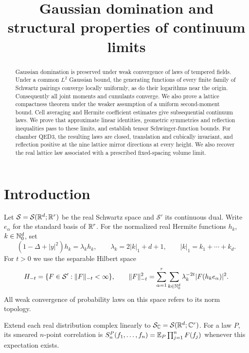 \documentclass[11pt,letterpaper,reqno]{amsart}
\title[Gaussian domination and continuum limits]
 {Gaussian domination and structural properties of continuum limits}
\date{}
\begin{document}
\begin{abstract}
Gaussian domination is preserved under weak convergence of laws of
tempered fields. Under a common $L^2$ Gaussian bound, the generating
functions of every finite family of Schwartz pairings converge
locally uniformly, as do their logarithms near the origin.
Consequently all joint moments and cumulants converge. We also
prove a lattice compactness theorem under the weaker assumption of
a uniform second-moment bound. Cell averaging and Hermite coefficient
estimates give subsequential continuum laws. We prove that approximate
linear identities, geometric symmetries and reflection inequalities
pass to these limits, and establish tensor Schwinger-function bounds.
For chamber QED3, the resulting laws are closed, translation and
cubically invariant, and reflection positive at the nine lattice
mirror directions at every height. We also recover the real lattice
law associated with a prescribed fixed-spacing volume limit.
\end{abstract}
\maketitle
\tableofcontents

\section{Introduction}\label{sec:introduction}
Let $\mathcal S=\mathcal S(\mathbb R^d;\mathbb R^r)$ be the real Schwartz space
and $\mathcal S'$ its continuous dual. Write $e_\alpha$ for the
standard basis of $\mathbb R^r$. For the normalized real Hermite functions
$h_k$, $k\in\mathbb N_0^d$, set
\[
 (1-\Delta+|y|^2)h_k=\lambda_k h_k,\qquad
 \lambda_k=2|k|_1+d+1,\qquad |k|_1=k_1+\cdots+k_d.
\]
For $t>0$ we use the separable Hilbert space
\begin{equation}\label{eq:hermite-space}
 H_{-t}=\{F\in\mathcal S':\|F\|_{-t}<\infty\},\qquad
 \|F\|_{-t}^2=
 \sum_{\alpha=1}^r\sum_{k\in\mathbb N_0^d}
       \lambda_k^{-2t}|F(h_ke_\alpha)|^2.
\end{equation}
All weak convergence of probability laws on this space refers to
its norm topology.

Extend each real distribution complex linearly to
$\mathcal S_{\mathbb C}=\mathcal S(\mathbb R^d;\mathbb C^r)$.
For a law $P$, its smeared $n$-point correlation is
$S_n^P(f_1,\ldots,f_n)=\mathbb E_P\prod_{j=1}^n F(f_j)$ whenever
this expectation exists.
\end{document}
